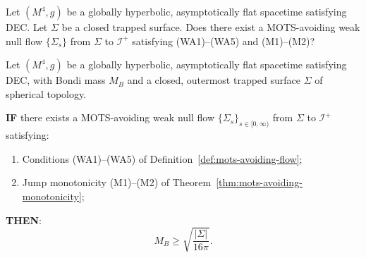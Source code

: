 \begin{openproblem}
\label{prob:unified-weak-flow}
Let $(M^4, g)$ be a globally hyperbolic, asymptotically flat spacetime satisfying DEC. Let $\Sigma$ be a closed trapped surface. Does there exist a MOTS-avoiding weak null flow $\{\Sigma_s\}$ from $\Sigma$ to $\mathscr{I}^+$ satisfying (WA1)--(WA5) and (M1)--(M2)?
\end{openproblem}

\begin{remark}
\begin{theorem}
\label{thm:main-conditional}
Let $(M^4, g)$ be a globally hyperbolic, asymptotically flat spacetime satisfying DEC, with Bondi mass $M_B$ and a closed, outermost trapped surface $\Sigma$ of spherical topology.

\textbf{IF} there exists a MOTS-avoiding weak null flow $\{\Sigma_s\}_{s \in [0,\infty)}$ from $\Sigma$ to $\mathscr{I}^+$ satisfying:
\begin{enumerate}[label=\textbf{(H\arabic*)}]
\item Conditions (WA1)--(WA5) of Definition~\ref{def:mots-avoiding-flow};
\item Jump monotonicity (M1)--(M2) of Theorem~\ref{thm:mots-avoiding-monotonicity};
\end{enumerate}
\textbf{THEN}:
\begin{equation}
M_B \geq \sqrt{\frac{|\Sigma|}{16\pi}}.
\end{equation}
\end{theorem}
\end{remark}

